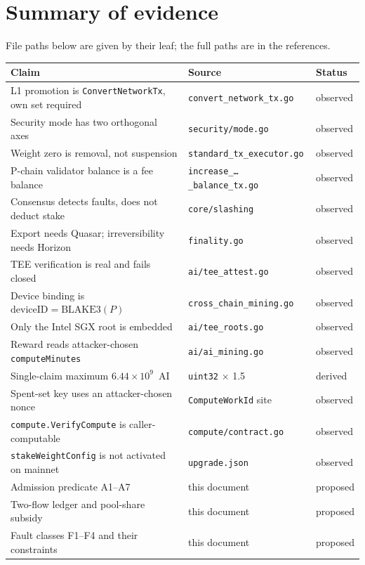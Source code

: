 \documentclass[11pt,a4paper]{article}
\theoremstyle{definition}
\theoremstyle{remark}
\newcommand{\code}[1]{\texttt{#1}}
\begin{document}
\section{Summary of evidence}

File paths below are given by their leaf; the full paths are in the references.

\begin{center}
\small
\begin{tabularx}{\textwidth}{@{}Xll@{}}
\toprule
Claim & Source & Status \\
\midrule
L1 promotion is \code{ConvertNetworkTx}, own set required & \code{convert\_network\_tx.go} & observed \\
Security mode has two orthogonal axes & \code{security/mode.go} & observed \\
Weight zero is removal, not suspension & \code{standard\_tx\_executor.go} & observed \\
P-chain validator balance is a fee balance & \code{increase\_\ldots\_balance\_tx.go} & observed \\
Consensus detects faults, does not deduct stake & \code{core/slashing} & observed \\
Export needs Quasar; irreversibility needs Horizon & \code{finality.go} & observed \\
TEE verification is real and fails closed & \code{ai/tee\_attest.go} & observed \\
Device binding is $\mathrm{deviceID} = \mathrm{BLAKE3}(P)$ & \code{cross\_chain\_mining.go} & observed \\
Only the Intel SGX root is embedded & \code{ai/tee\_roots.go} & observed \\
Reward reads attacker-chosen \code{computeMinutes} & \code{ai/ai\_mining.go} & observed \\
Single-claim maximum $6.44\times10^{9}$~AI & \code{uint32} $\times$ 1.5 & derived \\
Spent-set key uses an attacker-chosen nonce & \code{ComputeWorkId} site & observed \\
\code{compute.VerifyCompute} is caller-computable & \code{compute/contract.go} & observed \\
\code{stakeWeightConfig} is not activated on mainnet & \code{upgrade.json} & observed \\
Admission predicate A1--A7 & this document & proposed \\
Two-flow ledger and pool-share subsidy & this document & proposed \\
Fault classes F1--F4 and their constraints & this document & proposed \\
\bottomrule
\end{tabularx}
\end{center}
\end{document}
